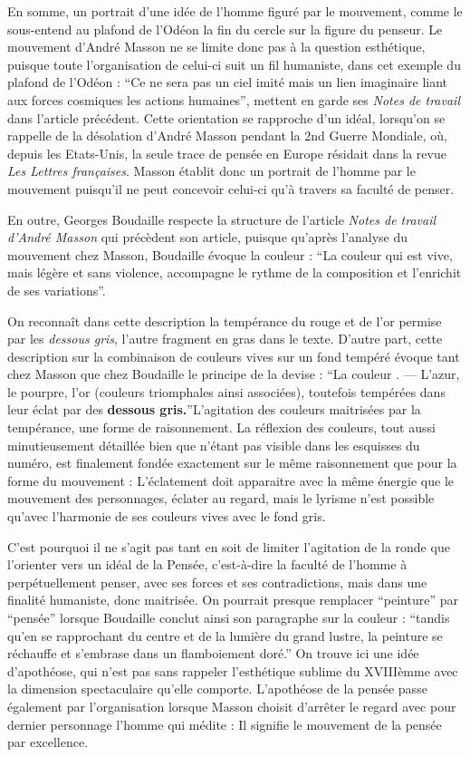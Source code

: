 	En somme, un portrait d’une idée de l’homme figuré par le mouvement, comme le sous-entend au plafond de l’Odéon la fin du cercle sur la figure du penseur. Le mouvement d’André Masson ne se limite donc pas à la question esthétique, puisque toute l’organisation de celui-ci suit un fil humaniste, dans cet exemple du plafond de l’Odéon : \enquote{Ce ne sera pas un ciel imité mais un lien imaginaire liant aux forces cosmiques les actions humaines}, mettent en garde ses \emph{Notes de travail} dans l’article précédent. Cette orientation se rapproche d’un idéal, lorsqu’on se rappelle de la désolation d’André Masson pendant la 2nd Guerre Mondiale, où, depuis les Etats-Unis, la seule trace de pensée en Europe résidait dans la revue \emph{Les Lettres françaises}. Masson établit donc un portrait de l’homme par le mouvement puisqu’il ne peut concevoir celui-ci qu’à travers sa faculté de penser. 

En outre, Georges Boudaille respecte la structure de l'article  \emph{Notes de travail d’André Masson} qui précèdent son article, puisque qu’après l’analyse du mouvement chez Masson, Boudaille évoque la couleur : \enquote{La couleur qui est vive, mais légère et sans violence, accompagne le rythme de la composition et l’enrichit de ses variations}. 


	On reconnaît dans cette description la tempérance du rouge et de l’or permise par les \emph{dessous gris}, l’autre fragment en gras dans le texte. D’autre part, cette description sur la combinaison de couleurs vives sur un fond tempéré évoque tant chez Masson que chez Boudaille le principe de la devise : \enquote{La couleur . — L’azur, le pourpre, l’or (couleurs triomphales ainsi associées), toutefois tempérées dans leur éclat par des \textbf{dessous gris.}}L’agitation des couleurs maitrisées par la tempérance, une forme de raisonnement. La réflexion des couleurs, tout aussi minutieusement détaillée bien que n’étant pas visible dans les esquisses du numéro, est finalement fondée exactement sur le même raisonnement que pour la forme du mouvement : L’éclatement doit apparaitre avec la même énergie que le mouvement des personnages, éclater au regard, mais le lyrisme n’est possible qu’avec l’harmonie de ses couleurs vives avec le fond gris.


	C’est pourquoi il ne s’agit pas tant en soit de limiter l’agitation de la ronde que l’orienter vers un idéal de la Pensée, c’est-à-dire la faculté de l’homme à perpétuellement penser, avec ses forces et ses contradictions, mais dans une finalité humaniste, donc maitrisée. On pourrait presque remplacer \enquote{peinture} par \enquote{pensée} lorsque Boudaille conclut ainsi son paragraphe sur la couleur : \enquote{tandis qu’en se rapprochant du centre et de la lumière du grand lustre, la peinture se réchauffe et s’embrase dans un flamboiement doré.}  On trouve ici une idée d’apothéose, qui n’est pas sans rappeler l’esthétique sublime du XVIIIèmme avec la dimension spectaculaire qu’elle comporte. L’apothéose de la pensée passe également par l’organisation lorsque Masson choisit d’arrêter le regard avec pour dernier personnage l’homme qui médite : Il signifie le mouvement de la pensée par excellence. 


